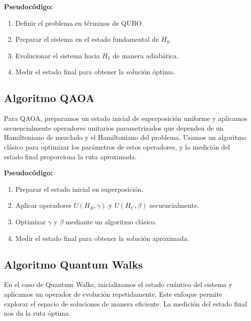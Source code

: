 \documentclass[11pt,a4paper,spanish]{book}
\begin{document}
\textbf{Pseudocódigo:}
\begin{tcolorbox}[colback=white!95!blue, colframe=blue!50!black, title=Quantum Annealing (QA), fontupper=\ttfamily]
\begin{enumerate}
    \item Definir el problema en términos de QUBO.
    \item Preparar el sistema en el estado fundamental de \(H_0\).
    \item Evolucionar el sistema hacia \(H_1\) de manera adiabática.
    \item Medir el estado final para obtener la solución óptima.
\end{enumerate}
\end{tcolorbox}

\subsection{Algoritmo QAOA}

Para QAOA, preparamos un estado inicial de superposición uniforme y aplicamos secuencialmente operadores unitarios parametrizados que dependen de un Hamiltoniano de mezclado y el Hamiltoniano del problema. Usamos un algoritmo clásico para optimizar los parámetros de estos operadores, y la medición del estado final proporciona la ruta aproximada.


\textbf{Pseudocódigo:}
\begin{tcolorbox}[colback=white!95!blue, colframe=blue!50!black, title=Quantum Approximate Optimization Algorithm (QAOA), fontupper=\ttfamily]
\begin{enumerate}
    \item Preparar el estado inicial en superposición.
    \item Aplicar operadores \(U(H_B, \gamma)\) y \(U(H_C, \beta)\) secuencialmente.
    \item Optimizar \(\gamma\) y \(\beta\) mediante un algoritmo clásico.
    \item Medir el estado final para obtener la solución aproximada.
\end{enumerate}
\end{tcolorbox}


\subsection{Algoritmo Quantum Walks}
En el caso de Quantum Walks, inicializamos el estado cuántico del sistema y aplicamos un operador de evolución repetidamente. Este enfoque permite explorar el espacio de soluciones de manera eficiente. La medición del estado final nos da la ruta óptima.
\end{document}
